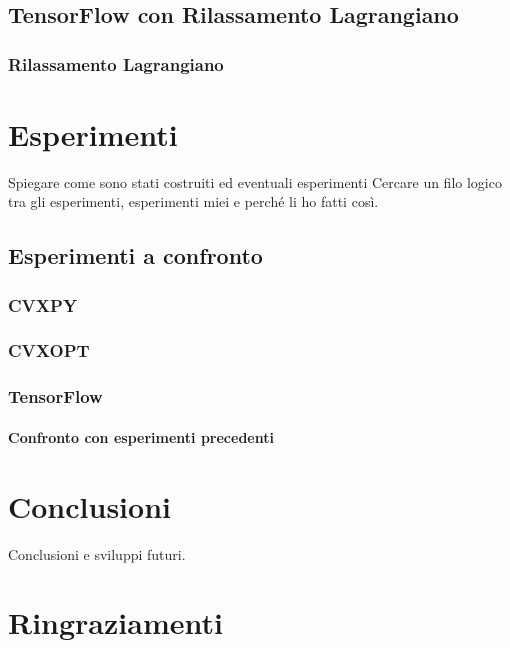 \documentclass[a4paper,12pt]{report}
\begin{document}
\section{TensorFlow con Rilassamento Lagrangiano}
\subsection{Rilassamento Lagrangiano}

%

\chapter{Esperimenti}
\label{Captiolo 3}

Spiegare come sono stati costruiti ed eventuali esperimenti
Cercare un filo logico tra gli esperimenti, esperimenti miei e perché li ho fatti così.
\section{Esperimenti a confronto}
\subsection{CVXPY}
\subsection{CVXOPT}
\subsection{TensorFlow}
\subsubsection{Confronto con esperimenti precedenti}

\chapter{Conclusioni}
\label{Conclusioni}
Conclusioni e sviluppi futuri.

\chapter*{Ringraziamenti}
\label{Ringraziamenti}

%
%



\end{document}
